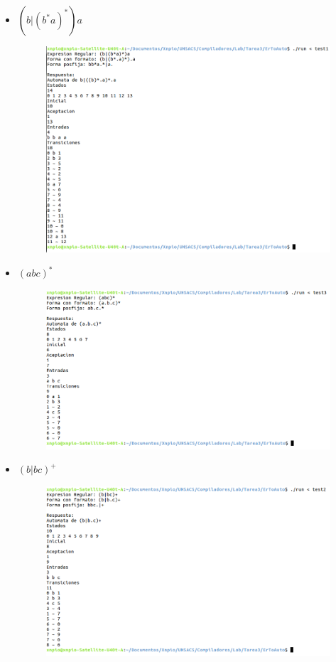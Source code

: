 \documentclass[a4paper,12pt]{article}
\begin{document}
\begin{itemize}
 \item $(b|(b^{*}a)^{*})a$
 \begin{figure}[H]
  \centering
  \includegraphics[scale = 0.4]{1.png}
 \end{figure}
 \item $(abc)^{*}$
 \begin{figure}[H]
  \centering
  \includegraphics[scale = 0.4]{2.png}
 \end{figure}
 \item $(b|bc)^{+}$
 \begin{figure}[H]
  \centering
  \includegraphics[scale = 0.4]{3.png}

\end{figure}
\end{itemize}
\end{document}
